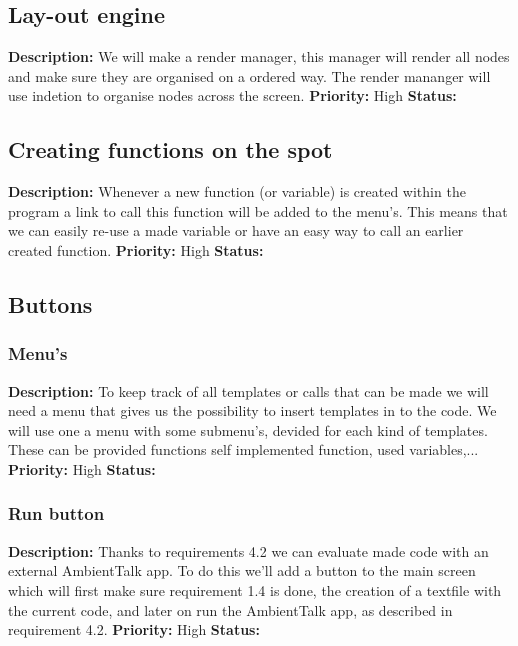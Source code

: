 \documentclass[a4paper,12pt]{report}
\begin{document}
\subsection{Lay-out engine}
\textbf{Description: } We will make a render manager, this manager will render all nodes and make sure they are organised on a ordered way. The render mananger will use
indetion to organise nodes across the screen.
\textbf{Priority:} High \newline
\textbf{Status: } \newline
\subsection{Creating functions on the spot}
\textbf{Description: } Whenever a new function (or variable) is created within the program a link to call this function will be added to the menu's. This means that we can
easily re-use a made variable or have an easy way to call an earlier created function. \newline
\textbf{Priority:} High \newline
\textbf{Status: } \newline
\subsection{Buttons}
\subsubsection{Menu's}
\textbf{Description: } To keep track of all templates or calls that can be made we will need a menu that gives us the possibility to insert templates in to the code.
We will use one a menu with some submenu's, devided for each kind of templates. These can be provided functions self implemented function, used variables,... \newline
\textbf{Priority:} High \newline
\textbf{Status: } \newline
\subsubsection{Run button}
\textbf{Description: } Thanks to requirements 4.2 we can evaluate made code with an external AmbientTalk app. To do this we'll add a button
to the main screen which will first make sure requirement 1.4 is done, the creation of a textfile with the current code, and later on run the AmbientTalk app, as described in requirement 4.2.
\textbf{Priority:} High \newline
\textbf{Status: } \newline
\end{document}
